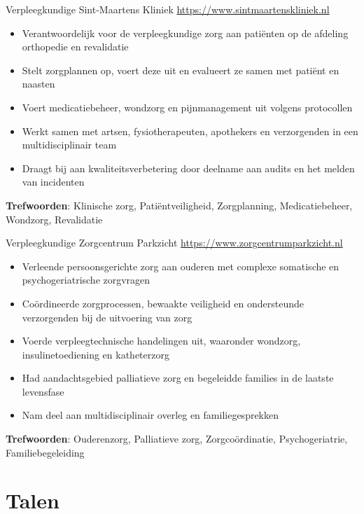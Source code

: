 \documentclass[a4paper, serif, 10pt]{moderncv}
\begin{document}
        {Verpleegkundige}
        {Sint-Maartens Kliniek}
        {\url{https://www.sintmaartenskliniek.nl}}
        {}
        {\begin{itemize}
\item Verantwoordelijk voor de verpleegkundige zorg aan patiënten op de afdeling orthopedie en revalidatie
\item Stelt zorgplannen op, voert deze uit en evalueert ze samen met patiënt en naasten
\item Voert medicatiebeheer, wondzorg en pijnmanagement uit volgens protocollen
\item Werkt samen met artsen, fysiotherapeuten, apothekers en verzorgenden in een multidisciplinair team
\item Draagt bij aan kwaliteitsverbetering door deelname aan audits en het melden van incidenten
\end{itemize}
\textbf{Trefwoorden}: Klinische zorg, Patiëntveiligheid, Zorgplanning, Medicatiebeheer, Wondzorg, Revalidatie}

        {Verpleegkundige}
        {Zorgcentrum Parkzicht}
        {\url{https://www.zorgcentrumparkzicht.nl}}
        {}
        {\begin{itemize}
\item Verleende persoonsgerichte zorg aan ouderen met complexe somatische en psychogeriatrische zorgvragen
\item Coördineerde zorgprocessen, bewaakte veiligheid en ondersteunde verzorgenden bij de uitvoering van zorg
\item Voerde verpleegtechnische handelingen uit, waaronder wondzorg, insulinetoediening en katheterzorg
\item Had aandachtsgebied palliatieve zorg en begeleidde families in de laatste levensfase
\item Nam deel aan multidisciplinair overleg en familiegesprekken
\end{itemize}
\textbf{Trefwoorden}: Ouderenzorg, Palliatieve zorg, Zorgcoördinatie, Psychogeriatrie, Familiebegeleiding}
\section{Talen}

\end{document}
